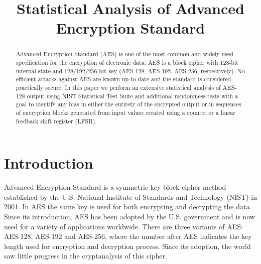 \documentclass[conference]{IEEEtran}
\begin{document}
\title{Statistical Analysis of Advanced Encryption Standard}
\author{
\and
{}
\and
{}
\and
{}
}

\maketitle

\begin{abstract}
Advanced Encryption Standard (AES) is one of the most common and widely used specification for the encryption of electronic data. AES is a block cipher with 128-bit internal state and 128/192/256-bit key (AES-128, AES-192, AES-256, respectively). No efficient attacks against AES are known up to date and the standard is considered practically secure. In this paper we perform an extensive statistical analysis of AES-128 output using NIST Statistical Test Suite and additional randomness tests with a goal to identify any bias in either the entirety of the encrypted output or in sequences of encryption blocks generated from input values created using a counter or a linear feedback shift register (LFSR). 
\end{abstract}

\IEEEpeerreviewmaketitle

\section{Introduction}

Advanced Encryption Standard is a symmetric key block cipher method established by the U.S. National Institute of Standards and Technology (NIST) in 2001. In AES the same key is used for both encrypting and decrypting the data. Since its introduction, AES has been adopted by the U.S. government and is now used for a variety of applications worldwide. There are three variants of AES: AES-128, AES-192 and AES-256, where the number after AES
indicates the key length used for encryption and decryption process. Since its adoption, the world saw little progress in the cryptanalysis of this cipher.
\end{document}
